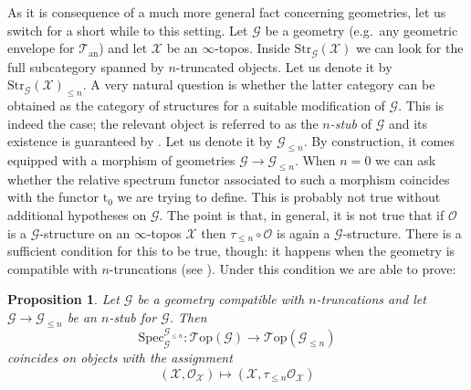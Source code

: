 \documentclass[12pt,a4paper,reqno]{amsart}
\theoremstyle{plain}
\newtheorem{prop}[thm]{Proposition}
\theoremstyle{definition}
\theoremstyle{remark}
\numberwithin{equation}{section}
\begin{document}
As it is consequence of a much more general fact concerning geometries, let us switch for a short while to this setting.
Let ${\mathcal G}$ be a geometry (e.g.\ any geometric envelope for ${{\mathcal T}_{\mathrm{an}}}$) and let ${\mathcal X}$ be an $\infty$-topos.
Inside ${\mathrm{Str}}_{\mathcal G}({\mathcal X})$ we can look for the full subcategory spanned by $n$-truncated objects. Let us denote it by ${\mathrm{Str}}_{\mathcal G}({\mathcal X})_{\le n}$.
A very natural question is whether the latter category can be obtained as the category of structures for a suitable modification of ${\mathcal G}$.
This is indeed the case; the relevant object is referred to as the \emph{$n$-stub} of ${\mathcal G}$ and its existence is guaranteed by \cite[Proposition 1.5.11]{DAG-V}.
Let us denote it by ${\mathcal G}_{\le n}$. By construction, it comes equipped with a morphism of geometries ${\mathcal G} \to {\mathcal G}_{\le n}$.
When $n = 0$ we can ask whether the relative spectrum functor associated to such a morphism coincides with the functor ${\mathrm{t}_0}$ we are trying to define.
This is probably not true without additional hypotheses on ${\mathcal G}$. The point is that, in general, it is not true that if ${\mathcal O}$ is a ${\mathcal G}$-structure on an $\infty$-topos ${\mathcal X}$ then $\tau_{\le n} \circ {\mathcal O}$ is again a ${\mathcal G}$-structure.
There is a sufficient condition for this to be true, though: it happens when the geometry is compatible with $n$-truncations (see \cite[Definition 3.3.2]{DAG-V}).
Under this condition we are able to prove:

\begin{prop} \label{prop:relative_spectrum_truncated_structured_topoi}
	Let ${\mathcal G}$ be a geometry compatible with $n$-truncations and let ${\mathcal G} \to {\mathcal G}_{\le n}$ be an $n$-stub for ${\mathcal G}$.
	Then
	\[ \mathrm{Spec}^{{\mathcal G}_{\le n}}_{\mathcal G} \colon {\mathcal T\mathrm{op}}({\mathcal G}) \to {\mathcal T\mathrm{op}}({\mathcal G}_{\le n}) \]
	coincides on objects with the assignment
	\[ ({\mathcal X}, {\mathcal O}_{\mathcal X}) \mapsto ({\mathcal X}, \tau_{\le n} {\mathcal O}_{\mathcal X}) \]
\end{prop}
\end{document}

